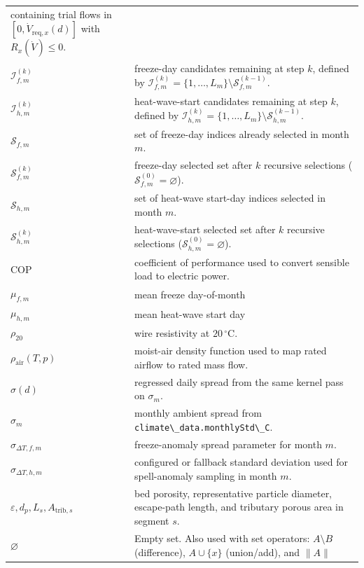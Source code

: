 {\begin{longtable}[]{@{}
  >{\raggedright\arraybackslash}p{}
  >{\raggedright\arraybackslash}p{}@{}}
containing trial flows in \([0,\dot V_{\mathrm{req},x}(d)]\) with
\(R_x(\dot V)\le 0\). \\
\(\mathcal{I}_{f,m}^{(k)}\) & freeze-day candidates remaining at step
\(k\), defined by
\(\mathcal{I}_{f,m}^{(k)}=\{1,\dots,L_m\}\setminus\mathcal{S}_{f,m}^{(k-1)}\). \\
\(\mathcal{I}_{h,m}^{(k)}\) & heat-wave-start candidates remaining at
step \(k\), defined by
\(\mathcal{I}_{h,m}^{(k)}=\{1,\dots,L_m\}\setminus\mathcal{S}_{h,m}^{(k-1)}\). \\
\(\mathcal{S}_{f,m}\) & set of freeze-day indices already selected in
month \(m\). \\
\(\mathcal{S}_{f,m}^{(k)}\) & freeze-day selected set after \(k\)
recursive selections (\(\mathcal{S}_{f,m}^{(0)}=\varnothing\)). \\
\(\mathcal{S}_{h,m}\) & set of heat-wave start-day indices selected in
month \(m\). \\
\(\mathcal{S}_{h,m}^{(k)}\) & heat-wave-start selected set after \(k\)
recursive selections (\(\mathcal{S}_{h,m}^{(0)}=\varnothing\)). \\
\(\mathrm{COP}\) & coefficient of performance used to convert sensible
load to electric power. \\
\(\mu_{f,m}\) & mean freeze day-of-month \\
\(\mu_{h,m}\) & mean heat-wave start day \\
\(\rho_{20}\) & wire resistivity at \(20\,^\circ\mathrm{C}\). \\
\(\rho_{\mathrm{air}}(T,p)\) & moist-air density function used to map
rated airflow to rated mass flow. \\
\(\sigma(d)\) & regressed daily spread from the same kernel pass on
\(\sigma_m\). \\
\(\sigma_m\) & monthly ambient spread from
\texttt{climate\textbackslash{}\_data.monthlyStd\textbackslash{}\_C}. \\
\(\sigma_{\Delta T,f,m}\) & freeze-anomaly spread parameter for month
\(m\). \\
\(\sigma_{\Delta T,h,m}\) & configured or fallback standard deviation
used for spell-anomaly sampling in month \(m\). \\
\(\varepsilon,d_p,L_s,A_{\mathrm{trib},s}\) & bed porosity,
representative particle diameter, escape-path length, and tributary
porous area in segment \(s\). \\
\(\varnothing\) & Empty set. Also used with set operators:
\(A\setminus B\) (difference), \(A\cup\{x\}\) (union/add), and \(\|A\|\)

\end{longtable}}
